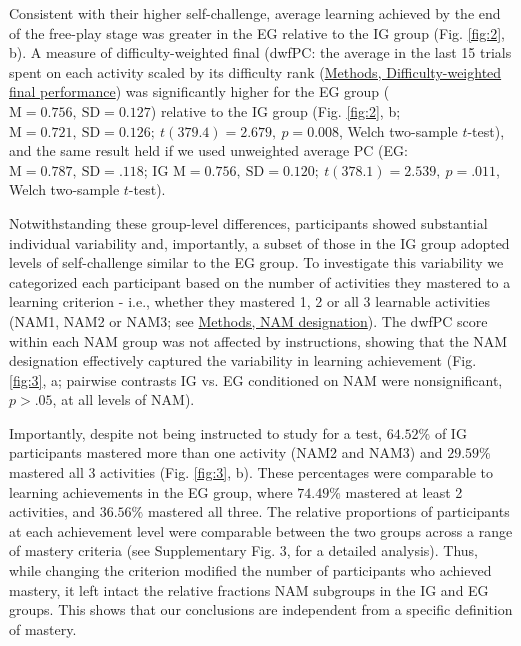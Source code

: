     Consistent with their higher self-challenge, average learning achieved by the end of the free-play stage was greater in the EG relative to the IG group (Fig. \ref{fig:2}, b). A measure of difficulty-weighted final {\PC} (dwfPC: the average {\PC} in the last 15 trials spent on each activity scaled by its difficulty rank (\hyperref[subsubsec:methods/analysis/dwfpc]{Methods, Difficulty-weighted final performance}) was significantly higher for the EG group ($\text{M} = 0.756,\ \text{SD} = 0.127$) relative to the IG group (Fig. \ref{fig:2}, b; $\text{M} = 0.721,\ \text{SD} = 0.126;\ t(379.4) = 2.679,\ p = 0.008$, Welch two-sample $t$-test), and the same result held if we used unweighted average PC (EG: $\text{M}=0.787,\ \text{SD}=.118$; IG $\text{M}=0.756,\ \text{SD}=0.120;\ t(378.1) = 2.539,\ p = .011$, Welch two-sample $t$-test). 
    
    Notwithstanding these group-level differences, participants showed substantial individual variability and, importantly, a subset of those in the IG group adopted levels of self-challenge similar to the EG group. To investigate this variability we categorized each participant based on the number of activities they mastered to a learning criterion - i.e., whether they mastered 1, 2 or all 3 learnable activities (NAM1, NAM2 or NAM3; see \hyperref[subsubsec:methods/analysis/nam]{Methods, NAM designation}). The dwfPC score within each NAM group was not affected by instructions, showing that the NAM designation effectively captured the variability in learning achievement (Fig. \ref{fig:3}, a; pairwise contrasts IG vs. EG conditioned on NAM were nonsignificant, $p>.05$, at all levels of NAM).
    
    Importantly, despite not being instructed to study for a test, $64.52\%$ of IG participants mastered more than one activity (NAM2 and NAM3) and $29.59\%$ mastered all 3 activities (Fig. \ref{fig:3}, b). These percentages were comparable to learning achievements in the EG group, where $74.49\%$ mastered at least 2 activities, and $36.56\%$ mastered all three. The relative proportions of participants at each achievement level were comparable between the two groups across a range of mastery criteria (see Supplementary Fig. 3, for a detailed analysis). Thus, while changing the criterion modified the number of participants who achieved mastery, it left intact the relative fractions NAM subgroups in the IG and EG groups. This shows that our conclusions are independent from a specific definition of mastery.
    
